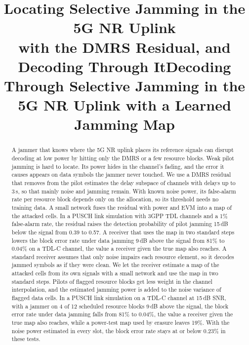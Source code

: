 \documentclass[conference]{IEEEtran}
\begin{document}
\ifstoryC
\title{Locating Selective Jamming in the 5G NR Uplink\\with the DMRS Residual, and Decoding Through It}
\else
\title{Decoding Through Selective Jamming in the 5G NR Uplink with a Learned Jamming Map}
\fi
\author{}
\maketitle

\begin{abstract}
A jammer that knows where the 5G NR uplink places its reference signals can disrupt decoding at
low power by hitting only the DMRS or a few resource blocks.
\ifstoryC
Weak pilot jamming is hard to locate. Its power hides in the channel's fading, and the error
it causes appears on data symbols the jammer never touched. We use a DMRS residual that removes
from the pilot estimates the delay subspace of channels with delays up to 3\,\textmu s, so that
mainly noise and jamming remain. With known noise power, its false-alarm rate per resource block
depends only on the allocation, so its threshold needs no training data. A small network fuses
the residual with power and EVM into a map of the attacked cells. In a PUSCH link simulation with
3GPP TDL channels and a 1\% false-alarm rate, the residual raises the detection probability of
pilot jamming 15\,dB below the signal from 0.39 to 0.57. A receiver that uses the map in two
standard steps lowers the block error rate under data jamming 9\,dB above the signal from 81\% to
0.04\% on a TDL-C channel, the value a receiver given the true map also reaches.
\else
A standard receiver assumes that only noise impairs each resource element, so it decodes jammed
symbols as if they were clean. We let the receiver estimate a map of the attacked cells from its
own signals with a small network and use the map in two standard steps. Pilots of flagged
resource blocks get less weight in the channel interpolation, and the estimated jamming power is
added to the noise variance of flagged data cells. In a PUSCH link simulation on a TDL-C channel
at 15\,dB SNR, with a jammer on 4 of 12 scheduled resource blocks 9\,dB above the signal, the
block error rate under data jamming falls from 81\% to 0.04\%, the value a receiver given the true
map also reaches, while a power-test map used by erasure leaves 19\%. With the noise power
estimated in every slot, the block error rate stays at or below 0.23\% in these tests.
\fi
\end{abstract}
\end{document}
